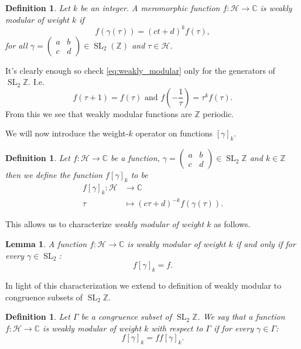 \documentclass[a4paper]{article}
\theoremstyle{theoremdd}
\newtheorem{lemma}[theorem]{Lemma}
\theoremstyle{definitiondd}
\newtheorem{definition}[theorem]{Definition}
\theoremstyle{remarkdd}
\newcommand{\Z}{\mathbb{Z}}
\newcommand{\C}{\mathbb{C}}
\DeclareMathOperator{\SL}{SL}
\begin{document}
\begin{definition}
	Let $k$ be an integer. 
	A meromorphic function $f: \mathcal{H}  \to \C$ is \emph{weakly modular of weight $k$ } if \begin{equation} \label{eq:weakly_modular}
		f(\gamma(\tau)) = (ct + d)^{k}f(\tau)
	,\end{equation}
	for all $\gamma = \begin{pmatrix} a & b \\ c & d \end{pmatrix}  \in \SL_2(\Z)$ and $\tau \in \mathcal{H} $. 
\end{definition}

It's clearly enough so check \eqref{eq:weakly_modular} only for the generators of $\SL_2\Z$. I.e.\begin{equation}\label{eq:sufficient_weakly_modular}
	f(\tau + 1) = f(\tau) \text{ and } f\left(-\frac{1}{\tau}\right)  = \tau^{k}f(\tau)
.\end{equation} 
From this we see that weakly modular functions are $\Z$ periodic. 

We will now introduce the weight-$k$ operator on functions $[\gamma]_k$.
 \begin{definition}
	 Let $f: \mathcal{H}  \to \C$ be a function,  $\gamma = \begin{pmatrix} a & b \\ c & d \end{pmatrix} \in \SL_2\Z$ and $k \in \Z$ then we define the function $f[\gamma]_k$ to be 
	  \begin{align*}
		  f[\gamma]_k: \mathcal{H}  &\longrightarrow \C \\
		  \tau &\longmapsto (c\tau + d)^{-k}f(\gamma(\tau))
	 .\end{align*}
\end{definition}
This allows us to characterize  \emph{weakly modular of weight  $k$} as follows.
 \begin{lemma}
	 A function $f: \mathcal{H}  \to \C$ is weakly modular of weight $k$ if and only if for every $\gamma \in \SL_2$: \[
		 f[\gamma]_k = f
	 .\] 
\end{lemma}
In light of this characterization we extend to definition of weakly modular to congruence subsets of $\SL_2\Z$. 

\begin{definition}
	Let $\Gamma$ be a congruence subset of $\SL_2\Z$. We say that a function $f: \mathcal{H}  \to \C$ is \emph{weakly modular of weight $k$ with respect to $\Gamma$} if for every  $ \gamma \in \Gamma$:
	 \[
		 f[\gamma]_k = ff[\gamma]_k 
	.\] 
\end{definition}
\end{document}
